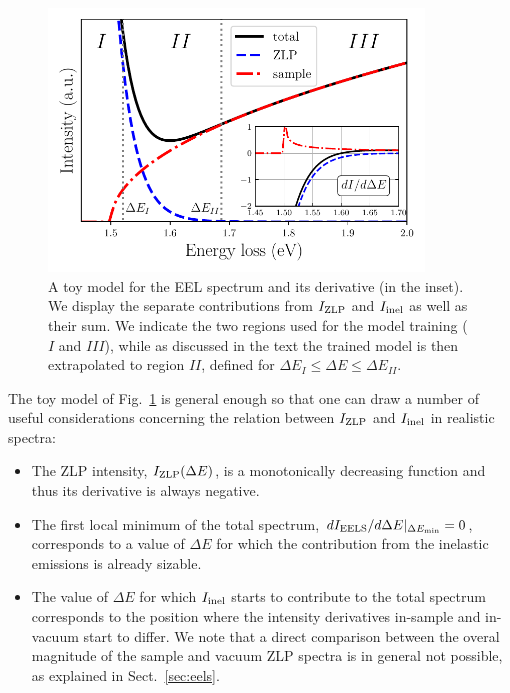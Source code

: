 \begin{figure}[t]
    \centering
    \includegraphics[width=0.89\textwidth]{plots/EELS_toy.pdf}
    \caption{A toy model for the EEL spectrum and its
      derivative (in the inset).
      We display the separate contributions from $I_{\rm ZLP}$
      and $I_{\rm inel}$ as well as their sum.
      We indicate the two regions used for the model training ($I$ and $III$),
      while as discussed in the text the trained model is then
      extrapolated to region $II$, defined for $\Delta E_I \le \Delta E \le \Delta E_{II}$.
    }
    \label{fig:EELS_toy}
\end{figure}

The toy model of Fig.~\ref{fig:EELS_toy} is general enough so that one can draw
a number of useful considerations concerning the relation between $I_{\rm ZLP}$ and $I_{\rm inel}$
in realistic spectra:

\begin{itemize}

\item The ZLP intensity, $I_{\rm ZLP}(\Delta E)$, is a monotonically decreasing function
  and thus its derivative is always negative.

\item  The first local minimum of the total spectrum, $dI_{\rm EELS}/d\Delta E|_{\Delta E_{\rm min}}=0$, corresponds
  to a value of $\Delta E$ for which the contribution from the inelastic emissions is already
  sizable.

\item The value of $\Delta E$ for which $I_{\rm inel}$ starts to contribute to the total spectrum
  corresponds to the position where the intensity derivatives in-sample and in-vacuum  start to differ.
  We note that a direct comparison between the overal magnitude of the sample and vacuum ZLP
  spectra is in general not possible, as explained in Sect.~\ref{sec:eels}. 
\end{itemize}

